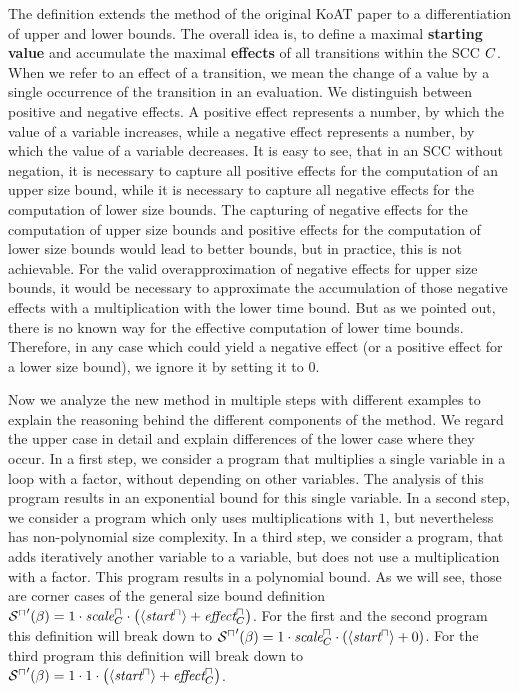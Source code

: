 The definition extends the method of the original KoAT paper \cite{koat} to a differentiation of upper and lower bounds.
The overall idea is, to define a maximal \textbf{starting value} and accumulate the maximal \textbf{effects} of all transitions within the SCC $C$.
When we refer to an effect of a transition, we mean the change of a value by a single occurrence of the transition in an evaluation.
We distinguish between positive and negative effects.
A positive effect represents a number, by which the value of a variable increases, while a negative effect represents a number, by which the value of a variable decreases.
It is easy to see, that in an SCC without negation, it is necessary to capture all positive effects for the computation of an upper size bound, while it is necessary to capture all negative effects for the computation of lower size bounds.
The capturing of negative effects for the computation of upper size bounds and positive effects for the computation of lower size bounds would lead to better bounds, but in practice, this is not achievable.
For the valid overapproximation of negative effects for upper size bounds, it would be necessary to approximate the accumulation of those negative effects with a multiplication with the lower time bound.
But as we pointed out, there is no known way for the effective computation of lower time bounds.
Therefore, in any case which could yield a negative effect (or a positive effect for a lower size bound), we ignore it by setting it to $0$.

Now we analyze the new method in multiple steps with different examples to explain the reasoning behind the different components of the method.
We regard the upper case in detail and explain differences of the lower case where they occur.
In a first step, we consider a program that multiplies a single variable in a loop with a factor, without depending on other variables.
The analysis of this program results in an exponential bound for this single variable.
In a second step, we consider a program which only uses multiplications with $1$, but nevertheless has non-polynomial size complexity.
In a third step, we consider a program, that adds iteratively another variable to a variable, but does not use a multiplication with a factor.
This program results in a polynomial bound.
As we will see, those are corner cases of the general size bound definition ${\mathcal{S}^\sqcap}'(\beta) = 1 \cdot \emph{scale}^\sqcap_C \cdot \left( \langle\emph{start}^\sqcap\rangle + \emph{effect}^\sqcap_C \right)$.
For the first and the second program this definition will break down to ${\mathcal{S}^\sqcap}'(\beta) = 1 \cdot \emph{scale}^\sqcap_C \cdot \left( \langle\emph{start}^\sqcap\rangle + 0 \right)$.
For the third program this definition will break down to ${\mathcal{S}^\sqcap}'(\beta) = 1 \cdot 1 \cdot \left( \langle\emph{start}^\sqcap\rangle + \emph{effect}^\sqcap_C \right)$.

